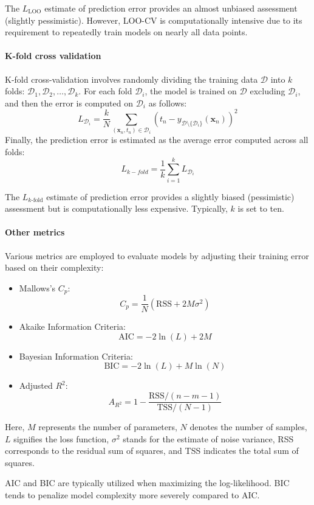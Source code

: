 The $L_{\text{LOO}}$ estimate of prediction error provides an almost unbiased assessment (slightly pessimistic). 
However, LOO-CV is computationally intensive due to its requirement to repeatedly train models on nearly all data points.

\paragraph*{K-fold cross validation}
K-fold cross-validation involves randomly dividing the training data $\mathcal{D}$ into $k$ folds: $\mathcal{D}_1,\mathcal{D}_2,\dots,\mathcal{D}_k$. 
For each fold $\mathcal{D}_i$, the model is trained on $\mathcal{D}$ excluding $\mathcal{D}_i$, and then the error is computed on $\mathcal{D}_i$ as follows:
\[L_{\mathcal{D}_i}=\dfrac{k}{N}\sum_{(\textbf{x}_n,t_n) \in \mathcal{D}_i} \left( t_n-y_{\mathcal{D}\setminus\{\mathcal{D}_i\}}(\textbf{x}_n) \right)^2\]
Finally, the prediction error is estimated as the average error computed across all folds:
\[L_{k-fold}=\dfrac{1}{k}\sum_{i=1}^{k}L_{\mathcal{D}_i}\]

The $L_{k\text{-fold}}$ estimate of prediction error provides a slightly biased (pessimistic) assessment but is computationally less expensive. 
Typically, $k$ is set to ten.

\paragraph*{Other metrics}
Various metrics are employed to evaluate models by adjusting their training error based on their complexity:
\begin{itemize}
    \item Mallows's $C_p$: 
        \[C_p=\dfrac{1}{N}\left( \text{RSS}+2M\sigma^2 \right)\]
    \item Akaike Information Criteria:
        \[\text{AIC}=-2\ln(L)+2M\]
    \item Bayesian Information Criteria: 
        \[\text{BIC}=-2\ln(L)+M\ln(N)\]
    \item Adjusted $R^2$:
        \[A_{R^2}=1-\dfrac{\text{RSS}/(n-m-1)}{\text{TSS}/(N-1)}\]
\end{itemize}
Here, $M$ represents the number of parameters, $N$ denotes the number of samples, $L$ signifies the loss function, $\sigma^2$ stands for the estimate of noise variance, RSS corresponds to the residual sum of squares, and TSS indicates the total sum of squares.

AIC and BIC are typically utilized when maximizing the log-likelihood. 
BIC tends to penalize model complexity more severely compared to AIC.